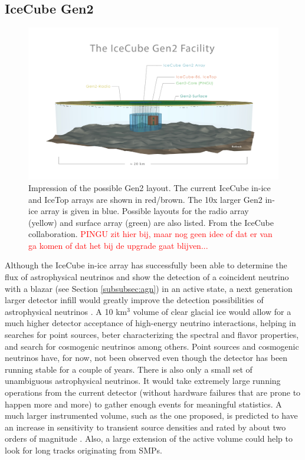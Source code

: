 \subsection{IceCube Gen2}
\begin{figure}[ht]
\centering
\includegraphics[width=\textwidth]{chapter5/img/gen2_structure.jpg}
\caption{Impression of the possible Gen2 layout. The current IceCube in-ice and IceTop arrays are shown in red/brown. The 10x larger Gen2 in-ice array is given in blue. Possible layouts for the radio array (yellow) and surface array (green) are also listed. From the IceCube collaboration. \textcolor{red}{PINGU zit hier bij, maar nog geen idee of dat er van ga komen of dat het bij de upgrade gaat blijven...}}
\label{fig:gen2}
\end{figure}

\noindent Although the IceCube in-ice array has successfully been able to determine the flux of astrophysical neutrinos and show the detection of a coincident neutrino with a blazar (see Section \ref{subsubsec:agn}) in an active state, a next generation larger detector infill would greatly improve the detection possibilities of astrophysical neutrinos \cite{Blaufuss:2015muc}. A 10 km$^3$ volume of clear glacial ice would allow for a much higher detector acceptance of high-energy neutrino interactions, helping in searches for point sources, beter characterizing the spectral and flavor properties, and search for cosmogenic neutrinos among others. Point sources and cosmogenic neutrinos have, for now, not been observed even though the detector has been running stable for a couple of years. There is also only a small set of unambiguous astrophysical neutrinos. It would take extremely large running operations from the current detector (without hardware failures that are prone to happen more and more) to gather enough events for meaningful statistics. A much larger instrumented volume, such as the one proposed, is predicted to have an increase in sensitivity to transient source densities and rated by about two orders of magnitude \cite{Ahlers:2014ioa}. Also, a large extension of the active volume could help to look for long tracks originating from SMPs.

